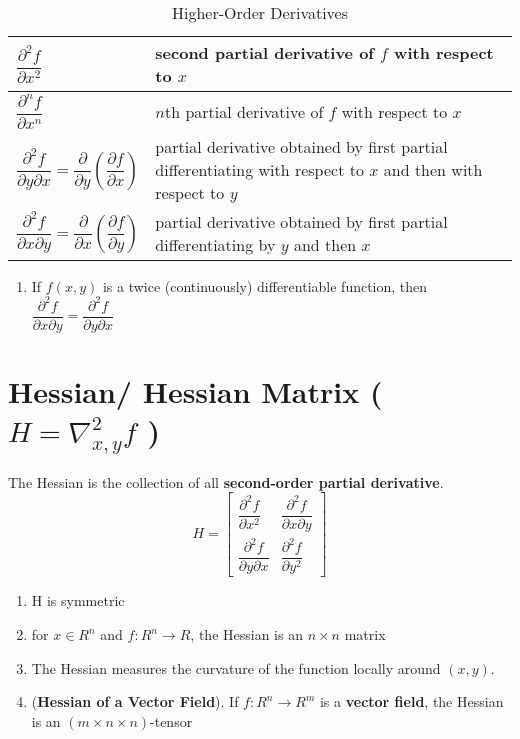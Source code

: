 \begin{table}[H]
    \centering
    \renewcommand{\arraystretch}{2.5}
    \begin{tabular}{|p{3cm}|p{12cm}|}
        \hline
        $\dfrac{\partial^2 f}{\partial x^2}$ & second partial derivative of $f$ with respect to $x$ \\
        \hline
        $\dfrac{\partial^n f}{\partial x^n}$ & $n$th partial derivative of $f$ with respect to $x$ \\
        \hline
        $\dfrac{\partial^2 f}{\partial y \partial x} = \dfrac{\partial}{\partial y}\left( \dfrac{\partial f}{\partial x} \right)$ & partial derivative obtained by first partial differentiating with respect to $x$ and then with respect to $y$ \\
        \hline
        $\dfrac{\partial^2 f}{\partial x \partial y} = \dfrac{\partial}{\partial x}\left( \dfrac{\partial f}{\partial y} \right)$ & partial derivative obtained by first partial differentiating by $y$ and then $x$ \\
        \hline
    \end{tabular}
    \caption{Higher-Order Derivatives}
\end{table}

\begin{enumerate}
    \item If $f(x, y)$ is a twice (continuously) differentiable function, then 
    $\dfrac{\partial^2 f}{\partial x \partial y} = \dfrac{\partial^2 f}{\partial y \partial x}$

\end{enumerate}


\section{Hessian/ Hessian Matrix ( $H = \nabla_{x,y}^2f$ )}\label{Hessian/ Hessian Matrix}
The Hessian is the collection of all \textbf{second-order partial derivative}.
\[
    H = 
    \begin{bmatrix}
        \dfrac{\partial^2 f}{\partial x^2} &
        \dfrac{\partial^2 f}{\partial x \partial y}\\
        \dfrac{\partial^2 f}{\partial y \partial x} &
        \dfrac{\partial^2 f}{\partial y^2}
    \end{bmatrix}
\]


\begin{enumerate}
    \item H is symmetric

    \item for $x \in R^n$ and $f : R^n \to R$, the Hessian is an $n \times n$ matrix

    \item The Hessian measures the curvature of the function locally around $(x, y)$.

    \item (\textbf{Hessian of a Vector Field}). If $f : R^n \to R^m$ is a \textbf{vector field}, the Hessian is an $(m \times n \times n)$-tensor
\end{enumerate}



